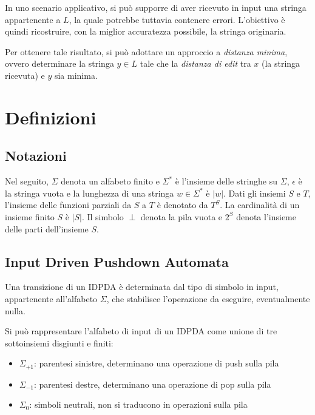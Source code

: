 \documentclass[a4paper,12pt]{report}
\begin{document}
    In uno scenario applicativo, si può supporre di aver ricevuto in input una stringa appartenente a $L$, la quale potrebbe tuttavia contenere errori. L'obiettivo è quindi ricostruire, con la miglior accuratezza possibile, la stringa originaria.

    Per ottenere tale risultato, si può adottare un approccio a \emph{distanza minima}, ovvero determinare la stringa $y \in L$ tale che la \textit{distanza di edit} tra $x$ (la stringa ricevuta) e $y$ sia minima.

    \chapter{Definizioni}

    \section{Notazioni}
    
    Nel seguito, $\Sigma$ denota un alfabeto finito e $\Sigma^*$ è l'insieme delle stringhe su $\Sigma$, $\epsilon$ è la stringa vuota e la lunghezza di una stringa $w \in \Sigma^*$ è $|w|$. Dati gli insiemi $S$ e $T$, l'insieme delle funzioni parziali da $S$ a $T$ è denotato da $T^S$. La cardinalità di un insieme finito $S$ è $|S|$. Il simbolo $\perp$ denota la pila vuota e $2^S$ denota l'insieme delle parti dell'insieme $S$.

    \section{Input Driven Pushdown Automata}

    Una transizione di un IDPDA è determinata dal tipo di simbolo in input, appartenente all'alfabeto $\Sigma$, che stabilisce l'operazione da eseguire, eventualmente nulla.
    
    Si può rappresentare l'alfabeto di input di un IDPDA come unione di tre sottoinsiemi disgiunti e finiti:

    \begin{itemize}
        \item $\Sigma_{+1}$: parentesi sinistre, determinano una operazione di push sulla pila
        \item $\Sigma_{-1}$: parentesi destre, determinano una operazione di pop sulla pila
        \item $\Sigma_{0}$: simboli neutrali, non si traducono in operazioni sulla pila
    \end{itemize}
\end{document}
